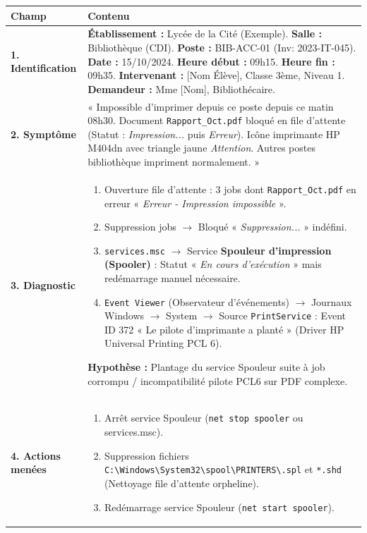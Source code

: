\documentclass[11pt]{article}
\begin{document}
\begin{exoresolu}
\begin{center}
\begin{tabularx}{\linewidth}{|l|X|}
\hline
\rowcolor{popblueL}
\textbf{Champ} & \textbf{Contenu} \\
\hline
\textbf{1. Identification} & \textbf{Établissement :} Lycée de la Cité (Exemple). \textbf{Salle :} Bibliothèque (CDI). \textbf{Poste :} BIB-ACC-01 (Inv: 2023-IT-045). \textbf{Date :} 15/10/2024. \textbf{Heure début :} 09h15. \textbf{Heure fin :} 09h35. \textbf{Intervenant :} [Nom Élève], Classe 3ème, Niveau 1. \textbf{Demandeur :} Mme [Nom], Bibliothécaire. \\
\hline
\textbf{2. Symptôme} & « Impossible d'imprimer depuis ce poste depuis ce matin 08h30. Document \texttt{Rapport\_Oct.pdf} bloqué en file d'attente (Statut : \textit{Impression...} puis \textit{Erreur}). Icône imprimante HP M404dn avec triangle jaune \textit{Attention}. Autres postes bibliothèque impriment normalement. » \\
\hline
\textbf{3. Diagnostic} & \begin{enumerate}
    \item Ouverture file d'attente : 3 jobs dont \texttt{Rapport\_Oct.pdf} en erreur « \textit{Erreur - Impression impossible} ».
    \item Suppression jobs $\rightarrow$ Bloqué « \textit{Suppression...} » indéfini.
    \item \texttt{services.msc} $\rightarrow$ Service \textbf{Spouleur d'impression (Spooler)} : Statut « \textit{En cours d'exécution} » mais redémarrage manuel nécessaire.
    \item \texttt{Event Viewer} (Observateur d'événements) $\rightarrow$ Journaux Windows $\rightarrow$ System $\rightarrow$ Source \texttt{PrintService} : Event ID 372 « Le pilote d'imprimante a planté » (Driver HP Universal Printing PCL 6).
\end{enumerate}
\textbf{Hypothèse :} Plantage du service Spouleur suite à job corrompu / incompatibilité pilote PCL6 sur PDF complexe. \\
\hline
\textbf{4. Actions menées} & \begin{enumerate}
    \item Arrêt service Spouleur (\texttt{net stop spooler} ou services.msc).
    \item Suppression fichiers \texttt{C:\textbackslash Windows\textbackslash System32\textbackslash spool\textbackslash PRINTERS\textbackslash *.spl} et \texttt{*.shd} (Nettoyage file d'attente orpheline).
    \item Redémarrage service Spouleur (\texttt{net start spooler}).

\end{enumerate}
\end{tabularx}
\end{center}
\end{exoresolu}
\end{document}
